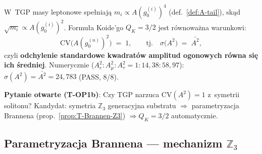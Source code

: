 \begin{corollary}[Formulacja TGP: $\mathrm{CV}(A^2)=1$]%
\label{cor:T-CV-Atail}
W~TGP masy leptonowe spe\l{}niaj\k{a} $m_i \propto A(g_0^{(i)})^4$
(def.~\ref{def:A-tail}), sk\k{a}d $\sqrt{m_i} \propto A(g_0^{(i)})^2$.
Formu\l{}a Koide'go $Q_K = 3/2$ jest r\'ownowa\.zna warunkowi:
\begin{equation}\label{eq:T-CV-TGP}
  \mathrm{CV}\!\bigl(A(g_0^{(n)})^2\bigr) \;=\; 1,
  \qquad
  \text{tj.}\quad
  \sigma\!\bigl(A^2\bigr) \;=\; \bar{A^2},
\end{equation}
czyli \textbf{odchylenie standardowe kwadrat\'ow amplitud ogonowych
r\'owna si\k{e} ich \'{s}redniej}.
Numerycznie ($A_e^2:A_\mu^2:A_\tau^2 = 1:14{,}38:58{,}97$):
$\sigma(A^2) = \bar{A^2} = 24{,}783$ (PASS, 8/8).

\textbf{Pytanie otwarte (T-OP1b)}: Czy TGP narzuca
$\mathrm{CV}(A^2)=1$ z~symetrii solitonu?
Kandydat: symetria $\mathbb{Z}_3$ generacyjna substratu
$\Rightarrow$ parametryzacja Brannena (prop.~\ref{prop:T-Brannen-Z3})
$\Rightarrow Q_K = 3/2$ automatycznie.
\end{corollary}

\subsection{Parametryzacja Brannena --- mechanizm $\mathbb{Z}_3$}%
\label{ssec:T-Brannen}
\label{app:T-brannen}

